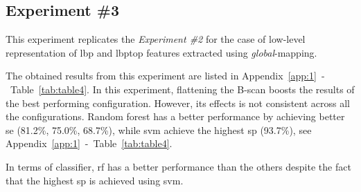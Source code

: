 \subsection{Experiment \#3}\label{subsec:exp3}
%
%
%
%

This experiment replicates the \emph{Experiment \#2} for the case of low-level representation of \ac{lbp} and \ac{lbptop} features extracted using \emph{global}-mapping.


The obtained results from this experiment are listed in Appendix~\ref{app:1}~-~Table~\ref{tab:table4}.
In this experiment, flattening the B-scan boosts the results of the best performing configuration.
However, its effects is not consistent across all the configurations.
Random forest has a better performance by achieving better \ac{se} (81.2\%, 75.0\%, 68.7\%), while \ac{svm} achieve the highest \ac{sp} (93.7\%), see Appendix~\ref{app:1}~-~Table~\ref{tab:table4}.

In terms of classifier, \ac{rf} has a better performance than the others despite the fact that the highest \ac{sp} is achieved using \ac{svm}.



